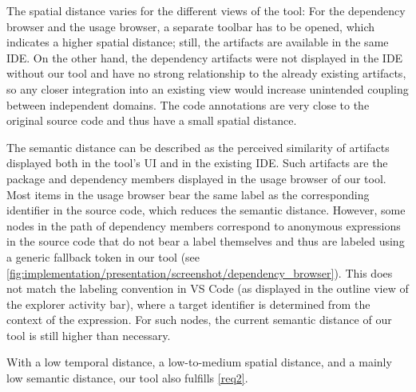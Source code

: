 The spatial distance varies for the different views of the tool:
For the dependency browser and the usage browser, a separate toolbar has to be opened, which indicates a higher spatial distance; still, the artifacts are available in the same IDE.
On the other hand, the dependency artifacts were not displayed in the IDE without our tool and have no strong relationship to the already existing artifacts, so any closer integration into an existing view would increase unintended coupling between independent domains.
The code annotations are very close to the original source code and thus have a small spatial distance.

The semantic distance can be described as the perceived similarity of artifacts displayed both in the tool's UI and in the existing IDE.
Such artifacts are the package and dependency members displayed in the usage browser of our tool.
Most items in the usage browser bear the same label as the corresponding identifier in the source code, which reduces the semantic distance.
However, some nodes in the path of dependency members correspond to anonymous expressions in the source code that do not bear a label themselves and thus are labeled using a generic fallback token in our tool (see \cref{fig:implementation/presentation/screenshot/dependency_browser}).
This does not match the labeling convention in VS Code (as displayed in the outline view of the explorer activity bar), where a target identifier is determined from the context of the expression.
For such nodes, the current semantic distance of our tool is still higher than necessary.

With a low temporal distance, a low-to-medium spatial distance, and a mainly low semantic distance, our tool also fulfills \cref{req2}.
